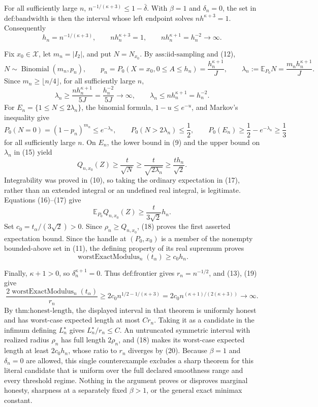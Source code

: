 For all sufficiently large \(n\), \(n^{-1/(\kappa+3)}\leq1-\bar\delta\).  With \(\beta=1\) and \(\delta_n=0\), the set in \(\text{def:bandwidth}\) is then the interval whose left endpoint solves \(nh^{\kappa+3}=1\).  Consequently
\[
h_n=n^{-1/(\kappa+3)},
\qquad
nh_n^{\kappa+3}=1,
\qquad
nh_n^{\kappa+1}=h_n^{-2}\longrightarrow\infty.
\tag{13}
\]

Fix \(x_0\in\mathcal X\), let \(m_n=|I_2|\), and put \(N=N_{x_0}\).  By \(\text{ass:iid-sampling}\) and (12),
\[
N\sim\operatorname{Binomial}(m_n,p_n),
\qquad
p_n=P_0(X=x_0,0\leq A\leq h_n)=\frac{h_n^{\kappa+1}}J,
\qquad
\lambda_n:=\mathbb E_{P_0}N=\frac{m_nh_n^{\kappa+1}}J.
\tag{14}
\]
Since \(m_n\geq\lfloor n/4\rfloor\), for all sufficiently large \(n\),
\[
\lambda_n\geq\frac{n h_n^{\kappa+1}}{5J}
=\frac{h_n^{-2}}{5J}\longrightarrow\infty,
\qquad
\lambda_n\leq nh_n^{\kappa+1}=h_n^{-2}.
\tag{15}
\]
For \(E_n=\{1\leq N\leq2\lambda_n\}\), the binomial formula, \(1-u\leq e^{-u}\), and Markov's inequality give
\[
P_0(N=0)=(1-p_n)^{m_n}\leq e^{-\lambda_n},
\qquad
P_0(N>2\lambda_n)\leq\frac12,
\qquad
P_0(E_n)\geq\frac12-e^{-\lambda_n}\geq\frac13
\tag{16}
\]
for all sufficiently large \(n\).  On \(E_n\), the lower bound in (9) and the upper bound on \(\lambda_n\) in (15) yield
\[
Q_{n,x_0}(Z)
\geq\frac{t}{\sqrt{N}}
\geq\frac{t}{\sqrt{2\lambda_n}}
\geq\frac{t h_n}{\sqrt2}.
\tag{17}
\]
Integrability was proved in (10), so taking the ordinary expectation in (17), rather than an extended integral or an undefined real integral, is legitimate.  Equations (16)--(17) give
\[
\mathbb E_{P_0}Q_{n,x_0}(Z)
\geq\frac{t}{3\sqrt2}h_n.
\tag{18}
\]
Set \(c_0=t_\alpha/(3\sqrt2)>0\).  Since \(\rho_n\geq Q_{n,x_0}\), (18) proves the first asserted expectation bound.  Since the handle at \((P_0,x_0)\) is a member of the nonempty bounded-above set in (11), the defining property of its real supremum proves
\[
\operatorname{worstExactModulus}_n(t_\alpha)\geq c_0h_n.
\tag{19}
\]

Finally, \(\kappa+1>0\), so \(\delta_n^{\kappa+1}=0\).  Thus \(\text{def:frontier}\) gives \(r_n=n^{-1/2}\), and (13), (19) give
\[
\frac{2\operatorname{worstExactModulus}_n(t_\alpha)}{r_n}
\geq2c_0n^{1/2-1/(\kappa+3)}
=2c_0n^{(\kappa+1)/(2(\kappa+3))}\longrightarrow\infty.
\tag{20}
\]
By \(\text{thm:honest-length}\), the displayed interval in that theorem is uniformly honest and has worst-case expected length at most \(Cr_n\).  Taking it as a candidate in the infimum defining \(L_n^\star\) gives \(L_n^\star/r_n\leq C\).  An untruncated symmetric interval with realized radius \(\rho_n\) has full length \(2\rho_n\), and (18) makes its worst-case expected length at least \(2c_0h_n\), whose ratio to \(r_n\) diverges by (20).  Because \(\beta=1\) and \(\delta_n=0\) are allowed, this single counterexample excludes a sharp theorem for this literal candidate that is uniform over the full declared smoothness range and every threshold regime.  Nothing in the argument proves or disproves marginal honesty, sharpness at a separately fixed \(\beta>1\), or the general exact minimax constant.